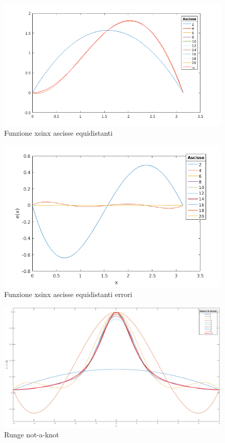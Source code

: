 \begin{figure}[h]
\caption{Funzione xsinx ascisse equidistanti}
\label{SinEq}
\includegraphics[width=\textwidth]{plot/Sin_equi}
\end{figure}
\begin{figure}[h]
\caption{Funzione xsinx ascisse equidistanti errori}
\label{SinEqErr}
\includegraphics[width=\textwidth]{plot/Sin_equi_err}
\end{figure}
\begin{figure}[h]
\caption{Runge not-a-knot}
\label{runge_nak}
\includegraphics[width=\textwidth]{plot/runge_nak}
\end{figure}
